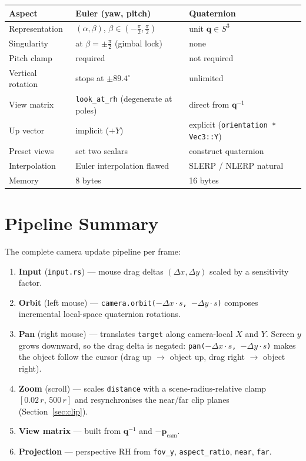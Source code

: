 \documentclass[11pt]{article}
\begin{document}
\begin{center}
\begin{tabular}{lll}
\toprule
Aspect & Euler (yaw, pitch) & Quaternion \\
\midrule
Representation        & $(\alpha, \beta)$, $\beta \in (-\tfrac{\pi}{2}, \tfrac{\pi}{2})$ & unit $\mathbf{q} \in S^3$ \\
Singularity            & at $\beta = \pm \tfrac{\pi}{2}$ (gimbal lock) & none \\
Pitch clamp           & required & not required \\
Vertical rotation     & stops at $\pm 89.4^\circ$ & unlimited \\
View matrix           & \texttt{look\_at\_rh} (degenerate at poles) & direct from $\mathbf{q}^{-1}$ \\
Up vector             & implicit ($+Y$) & explicit (\texttt{orientation * Vec3::Y}) \\
Preset views          & set two scalars & construct quaternion \\
Interpolation         & Euler interpolation flawed & SLERP / NLERP natural \\
Memory                & 8 bytes & 16 bytes \\
\bottomrule
\end{tabular}
\end{center}

\section{Pipeline Summary}

The complete camera update pipeline per frame:

\begin{enumerate}
  \item \textbf{Input} (\texttt{input.rs}) --- mouse drag deltas
        $(\Delta x, \Delta y)$ scaled by a sensitivity factor.
  \item \textbf{Orbit} (left mouse) --- \texttt{camera.orbit($-\Delta x \cdot s$,
        $-\Delta y \cdot s$)} composes incremental local-space quaternion
        rotations.
  \item \textbf{Pan} (right mouse) --- translates \texttt{target}
        along camera-local $X$ and $Y$.  Screen $y$ grows downward,
        so the drag delta is negated: \texttt{pan($-\Delta x \cdot s$,
        $-\Delta y \cdot s$)} makes the object follow the cursor
        (drag up $\to$ object up, drag right $\to$ object right).
  \item \textbf{Zoom} (scroll) --- scales \texttt{distance} with a
        scene-radius-relative clamp
        $[0.02\,r,\,500\,r]$ and resynchronises the near/far clip
        planes (Section~\ref{sec:clip}).
  \item \textbf{View matrix} --- built from
        $\mathbf{q}^{-1}$ and $-\mathbf{p}_{\text{cam}}$.
  \item \textbf{Projection} --- perspective RH from \texttt{fov\_y},
        \texttt{aspect\_ratio}, \texttt{near}, \texttt{far}.
\end{enumerate}
\end{document}
